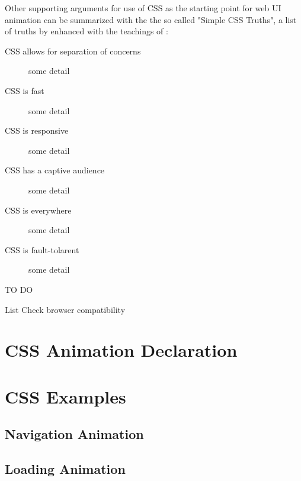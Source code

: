 Other supporting arguments for use of CSS as the starting point for web UI animation can be summarized with the the so called "Simple CSS Truths", a list of truths by \citet{palermoCSS} enhanced with the teachings of \citet{IAWEB}:

\begin{description}
\item [CSS allows for separation of concerns] some detail
\item [CSS is fast] some detail
\item [CSS is responsive] some detail
\item [CSS has a captive audience] some detail
\item [CSS is everywhere] some detail
\item [CSS is fault-tolarent] some detail
\end{description}


TO DO

List
Check browser compatibility


\section{CSS Animation Declaration} %
\label{sec:declarationCSS}

\citet{w3school}
\citep{w3school}


\citet{vtldesign}
\citep{vtldesign}



\section{CSS Examples} %
\label{sec:CSS_Examples}


\subsection{Navigation Animation} %
\label{subsec:navigationCSS}


\subsection{Loading Animation} %
\label{subsec:loadingCSS}


